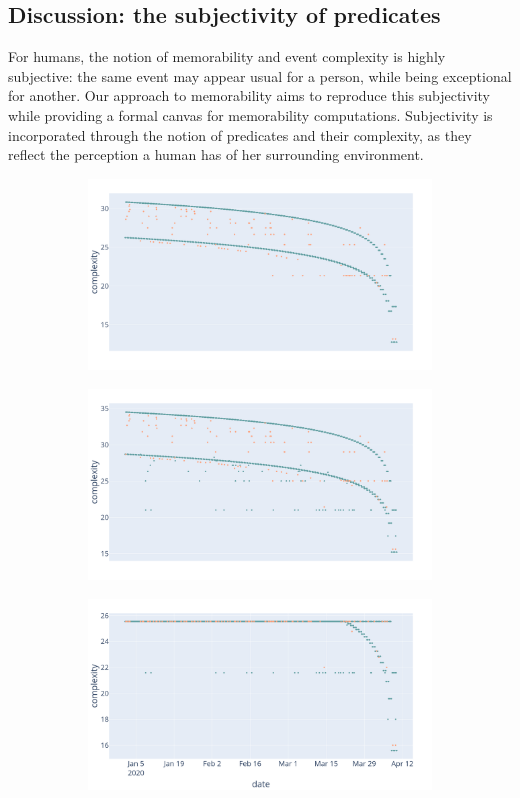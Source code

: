 \documentclass[entropy,article,submit,moreauthors,pdftex]{Definitions/mdpi}
\begin{document}
\subsection{Discussion: the subjectivity of predicates}
\label{sec:discussion}
For humans, the notion of memorability and event complexity is highly subjective: the same event may appear usual for a person, while being exceptional for another. Our approach to memorability aims to reproduce this subjectivity while providing a formal canvas for memorability computations. Subjectivity is incorporated through the notion of predicates and their complexity, as they reflect the perception a human has of her surrounding environment.

\begin{figure}[!ht]
    \centering
    \begin{subfigure}{\linewidth}
        \centering
        \includegraphics[width=.7\linewidth]{figures/preds_1.png}
        \caption{}
        \label{fig:pred_1}
    \end{subfigure}
    \begin{subfigure}{\linewidth}
        \centering
        \includegraphics[width=.7\linewidth]{figures/preds_2.png}
        \caption{}
        \label{fig:pred_2}
    \end{subfigure}
    \begin{subfigure}{\linewidth}
        \centering
        \includegraphics[width=.7\linewidth]{figures/preds_3.png}

\end{subfigure}
\end{figure}
\end{document}
